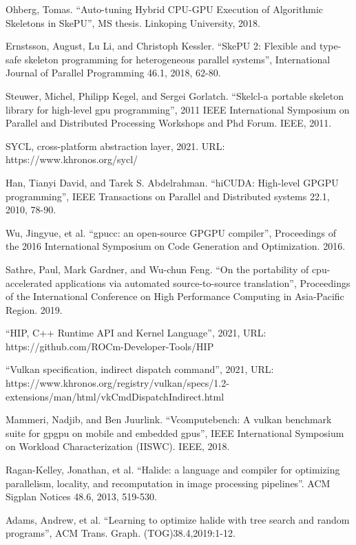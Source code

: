 \documentclass[11pt,fleqn,english,russian]{report} %
\begin{document}
\begin{thebibliography}{10}
	 Ohberg, Tomas. ``Auto-tuning Hybrid CPU-GPU Execution of Algorithmic Skeletons in SkePU'', MS thesis. Linkoping University, 2018.	
	
	 Ernstsson, August, Lu Li, and Christoph Kessler. ``SkePU 2: Flexible and type-safe skeleton programming for heterogeneous parallel systems'', International Journal of Parallel Programming 46.1, 2018, 62-80. 
	
	 Steuwer, Michel, Philipp Kegel, and Sergei Gorlatch. ``Skelcl-a portable skeleton library for high-level gpu programming'', 2011 IEEE International Symposium on Parallel and Distributed Processing Workshops and Phd Forum. IEEE, 2011. 
	
	 SYCL, cross-platform abstraction layer, 2021. URL: https://www.khronos.org/sycl/	
	
	
	 Han, Tianyi David, and Tarek S. Abdelrahman. ``hiCUDA: High-level GPGPU programming'', IEEE Transactions on Parallel and Distributed systems 22.1, 2010, 78-90. 	
	
	 Wu, Jingyue, et al. ``gpucc: an open-source GPGPU compiler'', Proceedings of the 2016 International Symposium on Code Generation and Optimization. 2016. 	
	
	 Sathre, Paul, Mark Gardner, and Wu-chun Feng. ``On the portability of cpu-accelerated applications via automated source-to-source translation'', Proceedings of the International Conference on High Performance Computing in Asia-Pacific Region. 2019.
	
	 ``HIP, C++ Runtime API and Kernel Language'', 2021, URL: https://github.com/ROCm-Developer-Tools/HIP	
	
	 ``Vulkan specification, indirect dispatch command'', 2021, URL: https://www.khronos.org/registry/vulkan/specs/1.2-extensions/man/html/vkCmdDispatchIndirect.html
	
	 Mammeri, Nadjib, and Ben Juurlink. ``Vcomputebench: A vulkan benchmark suite for gpgpu on mobile and embedded gpus'', IEEE International Symposium on Workload Characterization (IISWC). IEEE, 2018. 
	
	 Ragan-Kelley, Jonathan, et al. ``Halide: a language and compiler for optimizing parallelism, locality, and recomputation in image processing pipelines''. ACM Sigplan Notices 48.6, 2013, 519-530. 
	
	 Adams, Andrew, et al. ``Learning to optimize halide with tree search and random programs'', ACM Trans. Graph. (TOG)38.4,2019:1-12. 
	

\end{thebibliography}
\end{document}
